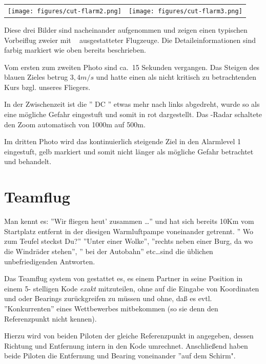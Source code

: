 \begin{center}
\begin{tabular}{c c}
\texttt{[image: figures/cut-flarm2.png]}&
\texttt{[image: figures/cut-flarm3.png]}\\
\end{tabular}
\end{center}
Diese drei Bilder sind nacheinander aufgenommen und zeigen einen typischen Vorbeiflug zweier
mit \fl~ ausgestatteter Flugzeuge. Die Detaileinformationen sind farbig markiert wie oben bereits
beschrieben.

Vom ersten zum zweiten Photo sind ca.\ 15 Sekunden vergangen.
Das Steigen des blauen Zieles betrug $3,4m/s$ und hatte einen als nicht
kritisch zu betrachtenden Kurs bzgl. unseres Fliegers.

In der Zwischenzeit  ist die '' DC '' etwas mehr nach links abgedreht, wurde so als
eine mögliche Gefahr eingestuft und somit in rot dargestellt.
Das \fl-Radar schaltete den Zoom automatisch von 1000m auf 500m.

Im dritten Photo wird das kontinuierlich steigende Ziel in den Alarmlevel 1
eingestuft, gelb markiert und somit nicht länger als mögliche Gefahr
betrachtet und behandelt.


\section{Teamflug}

Man kennt es: ''Wir fliegen heut' zusammen \dots'' und hat sich bereits 10Km vom
Startplatz entfernt in der diesigen Warmluftpampe voneinander getrennt. '' Wo zum Teufel steckst Du?''
''Unter einer Wolke'', ''rechts neben einer Burg, da wo die Windräder stehen'', '' bei der Autobahn'' etc\dots sind die üblichen
unbefriedigenden Antworten.

  Das Teamflug system von \xc gestattet es, es einem Partner in \xc seine Position
  in einem 5- stelligen Kode \textsl{exakt} mitzuteilen, ohne auf die Eingabe von Koordinaten und
  oder Bearings zurückgreifen zu müssen und ohne, daß es evtl. ''Konkurrenten'' eines Wettbewerbes mitbekommen
  (so sie denn den Referenzpunkt nicht kennen).

  Hierzu wird von beiden Piloten der gleiche  Referenzpunkt in \xc angegeben,
  dessen Richtung und Entfernung \xc intern in den Kode umrechnet.
  Anschließend haben beide Piloten die Entfernung und Bearing voneinander ''auf dem Schirm".

